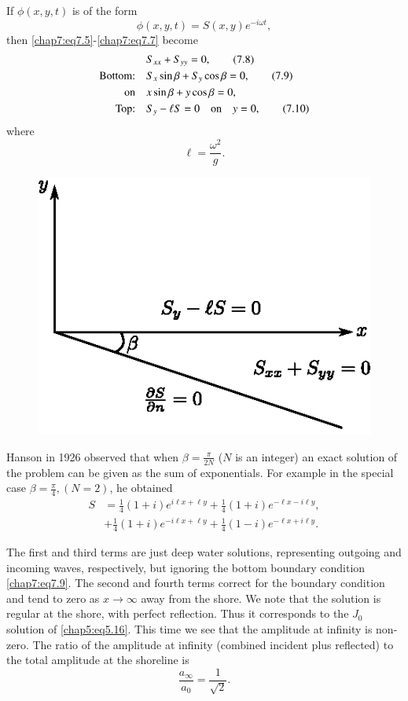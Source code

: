 If $\phi(x,y,t)$ is of the form
$$
\phi(x,y,t)=S(x,y)e^{-i\omega t},
$$
then \eqref{chap7:eq7.5}-\eqref{chap7:eq7.7} become
\begin{align}
& S_{xx}+S_{yy}=0,\tag{7.8}\label{chap7:eq7.8}\\
\text{Bottom:}\quad & S_x\sin\beta+S_y\cos\beta =0,\tag{7.9}\label{chap7:eq7.9}\\
\text{on}\quad & x\sin\beta+y\cos\beta =0,\notag\\
\text{Top:}\quad & S_y-\ell S=0\quad\text{on}\quad y=0, \tag{7.10}\label{chap7:eq7.10}
\end{align}
where
$$
\ell =\frac{\omega^2}{g}.
$$
\begin{figure}[H]
\centering
\includegraphics{figures/fig61-7.1.eps}
\caption{}
\label{chap1:fig7.1}
\end{figure}


Hanson in 1926 observed that when $\beta=\frac{\pi}{2N}$ ($N$ is an integer) an exact solution of the problem can be given as the sum of exponentials. For example in the special case $\beta=\frac{\pi}{4},(N=2)$, he obtained
\begin{equation}
\begin{aligned}
S&=\frac{1}{4}(1+i)e^{i\ell x+\ell y}+\frac{1}{4}(1+i)e^{-\ell x-i\ell y},\\
&+\frac{1}{4}(1+i)e^{-i\ell x+\ell y}+\frac{1}{4}(1-i)e^{-\ell x+i\ell y}.
\end{aligned}\tag{7.11}\label{chap7:eq7.11}
\end{equation}\pageoriginale

The first and third terms are just deep water solutions, representing outgoing and incoming waves, respectively, but ignoring the bottom boundary condition \eqref{chap7:eq7.9}. The second and fourth terms correct for the boundary condition and tend to zero as $x\to\infty$ away from the shore. We note that the solution is regular at the shore, with perfect reflection. Thus it corresponds to the $J_0$ solution of \eqref{chap5:eq5.16}. This time we see that the amplitude at infinity is non-zero. The ratio of the amplitude at infinity (combined incident plus reflected) to the total amplitude at the shoreline is 
\begin{equation}
\frac{a_\infty}{a_0}=\frac{1}{\sqrt{2}}.\tag{7.12}\label{chap7:eq7.12}
\end{equation}

